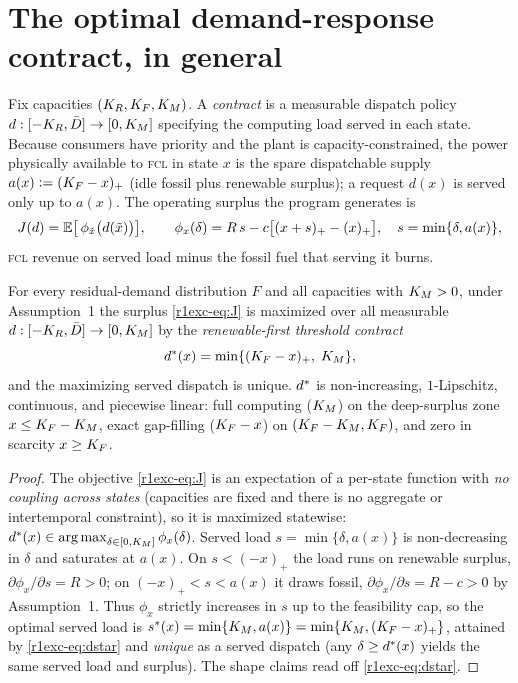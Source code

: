 \section{The optimal demand-response contract, in general}\label{r1exc-sec:contract}

Fix capacities $(K_R,K_F,K_M)$. A \emph{contract} is a measurable dispatch policy
$d:[-K_R,\bar D]\to[0,K_M]$ specifying the computing load served in each state.
Because consumers have priority and the plant is capacity-constrained, the power
physically available to \textsc{fcl} in state $x$ is the spare dispatchable
supply $a(x)\vcentcolon=(K_F-x)_+$ (idle fossil plus renewable surplus); a request
$d(x)$ is served only up to $a(x)$. The operating surplus the program generates is
\begin{equation}\label{r1exc-eq:J}
  J(d)=\mathbb{E}\big[\,\phi_{\tilde x}\big(d(\tilde x)\big)\big],
  \qquad
  \phi_x(\delta)=R\,s - c\big[(x+s)_+-(x)_+\big],\quad s=\min\{\delta,a(x)\},
\end{equation}
\textsc{fcl} revenue on served load minus the fossil fuel that serving it burns.

\begin{theorem}\label{r1exc-thm:contract}
For every residual-demand distribution $F$ and all capacities with $K_M>0$, under
Assumption~1 the surplus \eqref{r1exc-eq:J} is maximized over all measurable
$d:[-K_R,\bar D]\to[0,K_M]$ by the \emph{renewable-first threshold contract}
\begin{equation}\label{r1exc-eq:dstar}
  d^{*}(x)=\min\{(K_F-x)_+,\;K_M\},
\end{equation}
and the maximizing served dispatch is unique. $d^{*}$ is non-increasing,
$1$-Lipschitz, continuous, and piecewise linear: full computing
($K_M$) on the deep-surplus zone $x\le K_F-K_M$, exact gap-filling ($K_F-x$) on
$(K_F-K_M,K_F)$, and zero in scarcity $x\ge K_F$.
\end{theorem}

\begin{proof}
The objective \eqref{r1exc-eq:J} is an expectation of a per-state function with \emph{no
coupling across states} (capacities are fixed and there is no aggregate or
intertemporal constraint), so it is maximized statewise:
$d^{*}(x)\in\operatorname*{arg\,max}_{\delta\in[0,K_M]}\phi_x(\delta)$. Served load
$s=\min\{\delta,a(x)\}$ is non-decreasing in $\delta$ and saturates at $a(x)$. On
$s<(-x)_+$ the load runs on renewable surplus, $\partial\phi_x/\partial s=R>0$; on
$(-x)_+<s<a(x)$ it draws fossil, $\partial\phi_x/\partial s=R-c>0$ by
Assumption~1. Thus $\phi_x$ strictly increases in $s$ up to the feasibility cap,
so the optimal served load is $s^{*}(x)=\min\{K_M,a(x)\}=\min\{K_M,(K_F-x)_+\}$,
attained by \eqref{r1exc-eq:dstar} and \emph{unique} as a served dispatch (any
$\delta\ge d^{*}(x)$ yields the same served load and surplus). The shape claims
read off \eqref{r1exc-eq:dstar}.
\end{proof}

